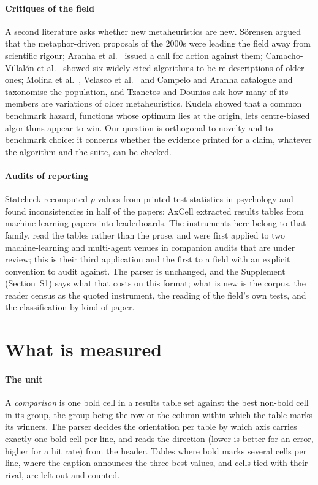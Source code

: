 \documentclass[preprint,review,12pt]{elsarticle}
\begin{document}
\paragraph{Critiques of the field} A second literature asks whether new metaheuristics are new. Sörensen \cite{sorensen2015metaheuristics} argued that the metaphor-driven proposals of the 2000s were leading the field away from scientific rigour; Aranha et al.\ \cite{aranha2022metaphor} issued a call for action against them; Camacho-Villalón et al.\ \cite{camacho2022exposing} showed six widely cited algorithms to be re-descriptions of older ones; Molina et al.\ \cite{molina2020comprehensive}, Velasco et al.\ \cite{velasco2024literature} and Campelo and Aranha \cite{campelo2023lessons} catalogue and taxonomise the population, and Tzanetos and Dounias \cite{tzanetos2021nature} ask how many of its members are variations of older metaheuristics. Kudela \cite{kudela2022critical} showed that a common benchmark hazard, functions whose optimum lies at the origin, lets centre-biased algorithms appear to win. Our question is orthogonal to novelty and to benchmark choice: it concerns whether the evidence printed for a claim, whatever the algorithm and the suite, can be checked.

\paragraph{Audits of reporting} Statcheck \cite{nuijten2016prevalence} recomputed $p$-values from printed test statistics in psychology and found inconsistencies in half of the papers; AxCell \cite{kardas2020axcell} extracted results tables from machine-learning papers into leaderboards. The instruments here belong to that family, read the tables rather than the prose, and were first applied to two machine-learning and multi-agent venues in companion audits that are under review; this is their third application and the first to a field with an explicit convention to audit against. The parser is unchanged, and the Supplement (Section~S1) says what that costs on this format; what is new is the corpus, the reader census as the quoted instrument, the reading of the field's own tests, and the classification by kind of paper.

\section{What is measured}
\label{sec:what}

\paragraph{The unit} A \emph{comparison} is one bold cell in a results table set against the best non-bold cell in its group, the group being the row or the column within which the table marks its winners. The parser decides the orientation per table by which axis carries exactly one bold cell per line, and reads the direction (lower is better for an error, higher for a hit rate) from the header. Tables where bold marks several cells per line, where the caption announces the three best values, and cells tied with their rival, are left out and counted.
\end{document}
